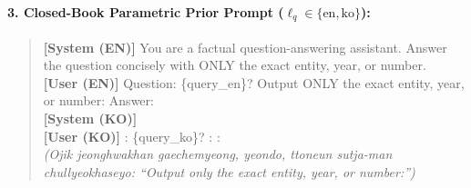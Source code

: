 \paragraph{3. Closed-Book Parametric Prior Prompt ($\ell_q \in \{\text{en}, \text{ko}\}$):}
\begin{quote}
\scriptsize\ttfamily
\textbf{[System (EN)]} You are a factual question-answering assistant. Answer the question concisely with ONLY the exact entity, year, or number.\\
\textbf{[User (EN)]} Question: \{query\_en\}? \quad Output ONLY the exact entity, year, or number: \quad Answer:\\[2pt]
\textbf{[System (KO)]} \\
\textbf{[User (KO)]} : \{query\_ko\}? \quad {}: \quad {}:\\
\normalfont\scriptsize\emph{(Ojik jeonghwakhan gaechemyeong, yeondo, ttoneun sutja-man chullyeokhaseyo: ``Output only the exact entity, year, or number:'')}
\end{quote}
